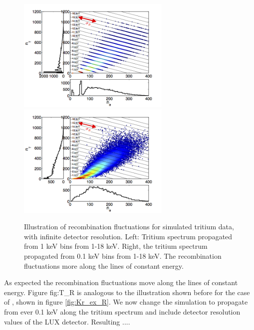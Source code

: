 \renewcommand{\baselinestretch}{1}
\small\normalsize
\begin{figure}[h!]\centering
\includegraphics[width=73mm]{Chapter_Flucs/Figures/EX_Plots/EX_T_R_1keV.png}
\includegraphics[width=73mm]{Chapter_Flucs/Figures/EX_Plots/EX_T_R_only.png}
\caption{Illustration of recombination fluctuations for simulated tritium data, with infinite detector resolution. Left: Tritium spectrum propagated from 1 keV bins from 1-18 keV. Right, the tritium spectrum propagated from 0.1 keV bins from 1-18 keV. The recombination fluctuations more along the lines of constant energy.}
\label{fig:T_R}
\end{figure}
\renewcommand{\baselinestretch}{2}
\small\normalsize

As expected the recombination fluctuations move along the lines of constant energy. Figure {fig:T_R} is analogous to the illustration shown before for the case of \KrCal, shown in figure \ref{fig:Kr_ex_R}. We now change the simulation to propagate from ever 0.1 keV along the tritium spectrum and include detector resolution values of the LUX detector. Resulting .... 


